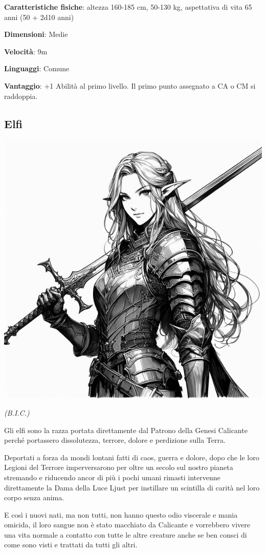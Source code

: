 \begin{multicols}{2}
\textbf{Caratteristiche fisiche}: altezza 160-185 cm, 50-130 kg, aspettativa di vita 65 anni (50 + 2d10 anni)

\textbf{Dimensioni}: Medie

\textbf{Velocità}: 9m

\textbf{Linguaggi}: Comune

\textbf{Vantaggio}: +1 Abilità al primo livello. Il primo punto assegnato a CA o CM si raddoppia.

\subsection{Elfi}\label{elfi}


\begin{center}
\includegraphics[height=0.7\linewidth]{immagini/elfa3-ai.png}

\textit{(B.I.C.)}
\end{center}

Gli elfi sono la razza portata direttamente dal Patrono della Genesi Calicante perché portassero dissolutezza, terrore, dolore e perdizione sulla Terra.

Deportati a forza da mondi lontani fatti di caos, guerra e dolore, dopo che le loro Legioni del Terrore imperversarono per oltre un secolo sul nostro pianeta stremando e riducendo ancor di più i pochi umani rimasti intervenne direttamente la Dama della Luce Ljust per instillare un scintilla di carità nel loro corpo senza anima.

E così i nuovi nati, ma non tutti, non hanno questo odio viscerale e mania omicida, il loro sangue non è stato macchiato da Calicante e vorrebbero vivere una vita normale a contatto con tutte le altre creature anche se ben consci di come sono visti e trattati da tutti gli altri.


\end{multicols}
